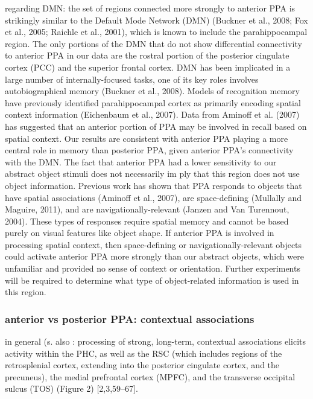 \documentclass[english]{article}
\begin{document}
\citep{baldassano2013differential} regarding DMN: the set of regions connected
more strongly to anterior PPA is strikingly similar to the Default Mode Network
(DMN) (Buckner et al., 2008; Fox et al., 2005; Raichle et al., 2001), which is
known to include the parahippocampal region.
%
The only portions of the DMN that do not show differential connectivity to
anterior PPA in our data are the rostral portion of the posterior cingulate
cortex (PCC) and the superior frontal cortex.  DMN has been implicated in a
large number of internally-focused tasks, one of its key roles involves
autobiographical memory (Buckner et al., 2008).  Models of recognition memory
have previously identified parahippocampal cortex as primarily encoding spatial
context information (Eichenbaum et al., 2007).
%
Data from Aminoff et al. (2007) has suggested that an anterior portion of PPA
may be involved in recall based on spatial context.
%
Our results are consistent with anterior PPA playing a more central role in
memory than posterior PPA, given anterior PPA's connectivity with the DMN. The
fact that anterior PPA had a lower sensitivity to our abstract object stimuli
does not necessarily im ply that this region does not use object information.
%
Previous work has shown that PPA responds to objects that have spatial
associations (Aminoff et al., 2007), are space-defining (Mullally and Maguire,
2011), and are navigationally-relevant (Janzen and Van Turennout, 2004).
%
These types of responses require spatial memory and cannot be based purely on
visual features like object shape.
%
If anterior PPA is involved in processing spatial context, then space-defining
or navigationally-relevant objects could activate anterior PPA more strongly
than our abstract objects, which were unfamiliar and provided no sense of
context or orientation.
%
Further experiments will be required to determine what type of object-related
information is used in this region.

\subsubsection{anterior vs posterior PPA: contextual associations}


\citep{aminoff2013role} in general (s. also \citep{aminoff2006parahippocampal}:
processing of strong, long-term, contextual associations elicits activity within
the PHC, as well as the RSC (which includes regions of the retrosplenial cortex,
extending into the posterior cingulate cortex, and the precuneus), the medial
prefrontal cortex (MPFC), and the transverse occipital sulcus (TOS) (Figure 2)
[2,3,59–67].
\end{document}
